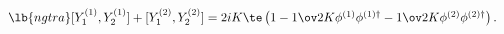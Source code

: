 \begin{equation}
\begin{array}{l}
\lb{ngtra}
[Y_{1}^{(1)}, Y_{2}^{(1)}] + [Y_{1}^{(2)}, Y_{2}^{(2)}] 
= 2iK\te \left( 1- {1\ov 2K}\phi^{(1)} \phi^{(1)\dag} 
- {1\ov 2K}\phi^{(2)} \phi^{(2)\dag} \right).
\end{array}
\end{equation}

